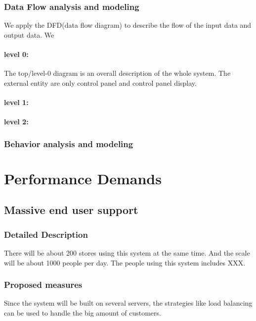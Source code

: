\documentclass[a4paper]{report}
\begin{document}
\subsection{Data Flow analysis and modeling}
We apply the DFD(data flow diagram) to describe the flow of the input data and output data.
We 
\subsubsection{level 0:} The top/level-0 diagram is an overall description of the whole system. The external entity are only control panel and control panel display.
\subsubsection{level 1:}
\subsubsection{level 2:}

\subsection{Behavior analysis and modeling}
\subsubsection{}
\subsubsection{}

\chapter{Performance Demands}

\section{Massive end user support}
\subsection{Detailed Description}
There will be about 200 stores using this system at the same time. And the scale will be about 1000 people per day. The people using this system includes XXX.
\subsection{Proposed measures}
Since the system will be built on several servers, the strategies like load balancing can be used to handle the big amount of customers.
\end{document}
